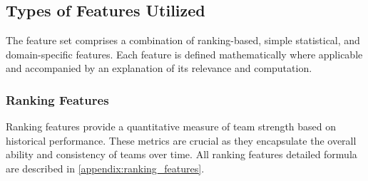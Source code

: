 \subsection{Types of Features Utilized}
\label{subsec:types_features}

The feature set comprises a combination of ranking-based, simple statistical, and domain-specific features. Each feature is defined mathematically where applicable and accompanied by an explanation of its relevance and computation.

\subsubsection{Ranking Features}
\label{subsubsec:ranking_features}

Ranking features provide a quantitative measure of team strength based on historical performance. These metrics are crucial as they encapsulate the overall ability and consistency of teams over time. All ranking features detailed formula are described in \ref{appendix:ranking_features}.

